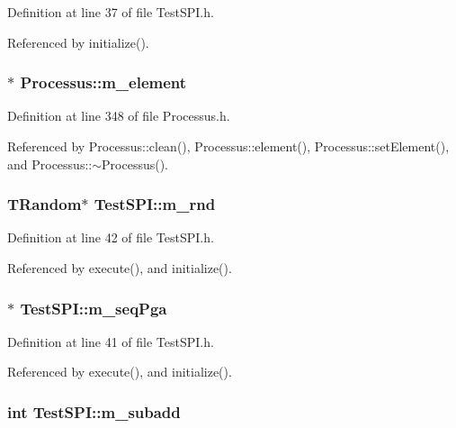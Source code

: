 Definition at line 37 of file TestSPI.h.

Referenced by initialize().\hypertarget{classProcessus_aa9d24d53c3e52f36786cabb5d8e296e7}{
\subsubsection[{m\_\-element}]{$\ast$ {\bf Processus::m\_\-element}}}
\label{classProcessus_aa9d24d53c3e52f36786cabb5d8e296e7}


Definition at line 348 of file Processus.h.

Referenced by Processus::clean(), Processus::element(), Processus::setElement(), and Processus::$\sim$Processus().\hypertarget{classTestSPI_a6dd3f4705c0fc8f36a3e71e67517e1cc}{
\subsubsection[{m\_\-rnd}]{\setlength{\rightskip}{0pt plus 5cm}TRandom$\ast$ {\bf TestSPI::m\_\-rnd}}}
\label{classTestSPI_a6dd3f4705c0fc8f36a3e71e67517e1cc}


Definition at line 42 of file TestSPI.h.

Referenced by execute(), and initialize().\hypertarget{classTestSPI_aab9cccf2a1594a2539b11d6c637389b0}{
\subsubsection[{m\_\-seqPga}]{$\ast$ {\bf TestSPI::m\_\-seqPga}}}
\label{classTestSPI_aab9cccf2a1594a2539b11d6c637389b0}


Definition at line 41 of file TestSPI.h.

Referenced by execute(), and initialize().\hypertarget{classTestSPI_a4bc59347208b4a5ae97188bdcfc31da2}{
\subsubsection[{m\_\-subadd}]{\setlength{\rightskip}{0pt plus 5cm}int {\bf TestSPI::m\_\-subadd}}}
\label{classTestSPI_a4bc59347208b4a5ae97188bdcfc31da2}



